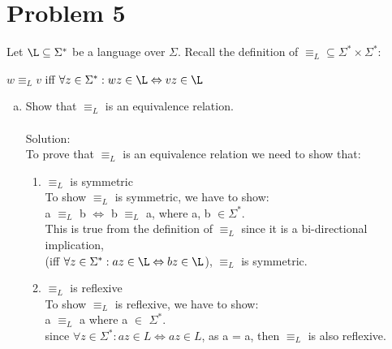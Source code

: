 \documentclass{article}
\newcommand*\moveToRight[1]{\hspace*{0em plus 1fill}\makebox{(#1)}}
\begin{document}
\section{Problem 5}
Let $\L \subseteq \Sigma^*$ be a language over $\Sigma$. Recall the definition of $\equiv_L \subseteq \Sigma^* \times \Sigma^*:$
\begin{center}
    $w \equiv_L v$  iff  $\forall z \in \Sigma^* : wz \in \L \Leftrightarrow vz \in \L$
\end{center}
\begin{enumerate}[(a)]
    \item Show that $\equiv_L$ is an equivalence relation. \moveToRight{6 marks}\\\\Solution:\\
    To prove that $\equiv_L$ is an equivalence relation we need to show that:
    
    \begin{enumerate} [1.]
        \item $\equiv_L$ is symmetric\\
        To show $\equiv_L$ is symmetric, we have to show:\\
        a $\equiv_L$ b $\iff$ b $\equiv_L$ a, where a, b $\in \Sigma^*$.
        \\
        This is true from the definition of $\equiv_L$ since it is a bi-directional implication,\\ (iff  $\forall z \in \Sigma^* : az \in \L \Leftrightarrow bz \in \L$), $\equiv_L$ is symmetric.
        
        \item $\equiv_L$ is reflexive\\
        To show $\equiv_L$ is reflexive, we have to show:\\
        a $\equiv_L$ a where a $\in$ $\Sigma^*$.\\
        since $\forall z \in \Sigma^* : az \in L \Leftrightarrow az \in L$, as a = a, then $\equiv_L$ is also reflexive.
        

\end{enumerate}
\end{enumerate}
\end{document}
